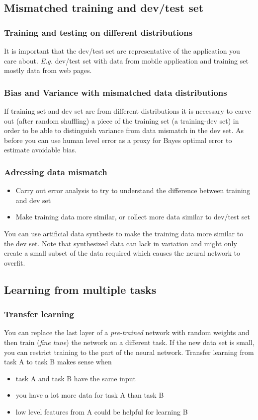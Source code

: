 \documentclass{article}
\begin{document}
\subsection{Mismatched training and dev/test set}
\subsubsection{Training and testing on different distributions}
It is important that the dev/test set are representative of the application you care about.
\emph{E.g.} dev/test set with data from mobile application and training set mostly data from web pages.

\subsubsection{Bias and Variance with mismatched data distributions}
If training set and dev set are from different distributions it is necessary to carve out (after random shuffling)
a piece of the training set (a training-dev set) in order to be able to distinguish variance from data mismatch in the dev set.
As before you can use human level error as a proxy for Bayes optimal error to estimate avoidable bias.

\subsubsection{Adressing data mismatch}
\begin{itemize}
  \item Carry out error analysis to try to understand the difference between training and dev set
  \item Make training data more similar, or collect more data similar to dev/test set
\end{itemize}
You can use artificial data synthesis to make the training data more similar to the dev set.
Note that synthesized data can lack in variation and might only create a small subset of the data required
which causes the neural network to overfit.

\subsection{Learning from multiple tasks}
\subsubsection{Transfer learning}
You can replace the last layer of a \emph{pre-trained} network with random weights and then train
(\emph{fine tune}) the network on a different task.
If the new data set is small, you can restrict training to the part of the neural network.
Transfer learning from task A to task B makes sense when
\begin{itemize}
  \item task A and task B have the same input
  \item you have a lot more data for task A than task B
  \item low level features from A could be helpful for learning B
\end{itemize}
\end{document}
